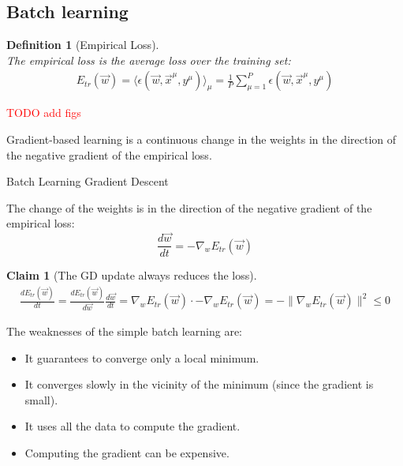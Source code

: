 \documentclass[11pt]{book} %
\newtheorem{definition}{Definition}[section]
\newtheorem*{claim*}{Claim}
\begin{document}
%
%

\subsection{Batch learning}

\begin{definition}[Empirical Loss]\ \\
    The empirical loss is the average loss over the training set:
    \begin{align}
        E_{tr}(\vec{w}) = \langle \epsilon(\vec{w}, \vec{x}^\mu, y^\mu ) \rangle_\mu =\frac{1}{P} \sum_{\mu=1}^{P} \epsilon (\vec{w}, \vec{x}^\mu, y^\mu)
    \end{align}
\end{definition}

\textcolor{red}{TODO add figs}


Gradient-based learning is a continuous change in the weights in the direction of the negative gradient of the empirical loss.

\begin{algorithm}[H]
    \SetAlgoLined
    \caption{Batch Learning Gradient Descent}
    The change of the weights is in the direction of the negative gradient of the empirical loss:
    \[ \frac{d\vec{w}}{dt} = -\nabla_w E_{tr}(\vec{w}) \]
\end{algorithm}
    

\begin{claim*}[The GD update always reduces the loss]\ \\
    \begin{align}
        \frac{d E_{tr}(\vec{w})}{dt} = \frac{dE_{tr}(\vec{w})}{d\vec{w}}  \frac{d\vec{w}}{dt} = 
        \nabla_w E_{tr}(\vec{w}) \cdot -\nabla_w E_{tr}(\vec{w}) =  - \lVert \nabla_w E_{tr}(\vec{w}) \rVert^2 \leq 0
    \end{align}
\end{claim*}

The weaknesses of the simple batch learning are:
\begin{itemize}
    \item It guarantees to converge only a local minimum.
    \item It converges slowly in the vicinity of the minimum (since the gradient is small).
    \item It uses all the data to compute the gradient.
    \item Computing the gradient can be expensive.
\end{itemize}
\end{document}
